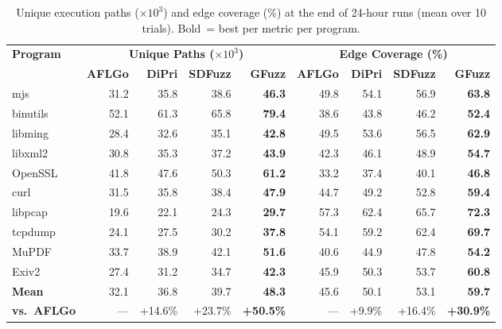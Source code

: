 \documentclass[preprint,12pt,3p]{elsarticle}
\begin{document}
\begin{table}[t]
\centering
\small
\caption{Unique execution paths ($\times 10^3$) and edge coverage (\%) at
  the end of 24-hour runs (mean over 10 trials). Bold~= best per metric
  per program.}
\label{tbl:paths_cov}
\begin{tabular}{lrrrr@{\quad}rrrr}
\toprule
\multirow{2}{*}{\textbf{Program}}
  & \multicolumn{4}{c}{\textbf{Unique Paths ($\times 10^3$)}}
  & \multicolumn{4}{c}{\textbf{Edge Coverage (\%)}} \\
\cmidrule(lr){2-5}\cmidrule(lr){6-9}
 & \textbf{AFLGo} & \textbf{DiPri} & \textbf{SDFuzz} & \textbf{GFuzz}
 & \textbf{AFLGo} & \textbf{DiPri} & \textbf{SDFuzz} & \textbf{GFuzz} \\
\midrule
mjs      & 31.2 & 35.8 & 38.6 & \textbf{46.3} & 49.8 & 54.1 & 56.9 & \textbf{63.8} \\
binutils & 52.1 & 61.3 & 65.8 & \textbf{79.4} & 38.6 & 43.8 & 46.2 & \textbf{52.4} \\
libming  & 28.4 & 32.6 & 35.1 & \textbf{42.8} & 49.5 & 53.6 & 56.5 & \textbf{62.9} \\
libxml2  & 30.8 & 35.3 & 37.2 & \textbf{43.9} & 42.3 & 46.1 & 48.9 & \textbf{54.7} \\
OpenSSL  & 41.8 & 47.6 & 50.3 & \textbf{61.2} & 33.2 & 37.4 & 40.1 & \textbf{46.8} \\
curl     & 31.5 & 35.8 & 38.4 & \textbf{47.9} & 44.7 & 49.2 & 52.8 & \textbf{59.4} \\
libpcap  & 19.6 & 22.1 & 24.3 & \textbf{29.7} & 57.3 & 62.4 & 65.7 & \textbf{72.3} \\
tcpdump  & 24.1 & 27.5 & 30.2 & \textbf{37.8} & 54.1 & 59.2 & 62.4 & \textbf{69.7} \\
MuPDF    & 33.7 & 38.9 & 42.1 & \textbf{51.6} & 40.6 & 44.9 & 47.8 & \textbf{54.2} \\
Exiv2    & 27.4 & 31.2 & 34.7 & \textbf{42.3} & 45.9 & 50.3 & 53.7 & \textbf{60.8} \\
\midrule
\textbf{Mean}      & 32.1 & 36.8 & 39.7 & \textbf{48.3}
                   & 45.6 & 50.1 & 53.1 & \textbf{59.7} \\
\textbf{vs.\ AFLGo} & --- & +14.6\% & +23.7\% & \textbf{+50.5\%}
                    & --- & +9.9\% & +16.4\% & \textbf{+30.9\%} \\
\bottomrule
\end{tabular}
\end{table}
\end{document}
